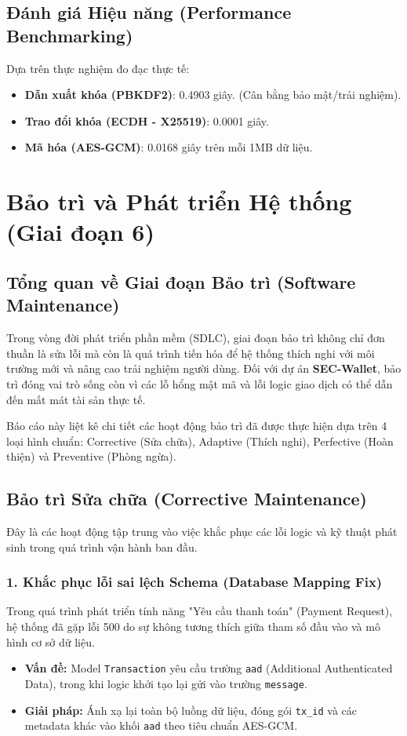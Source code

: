 \documentclass[11pt,a4paper]{article}
\begin{document}
\subsection{Đánh giá Hiệu năng (Performance Benchmarking)}
Dựa trên thực nghiệm đo đạc thực tế:
\begin{itemize}
    \item \textbf{Dẫn xuất khóa (PBKDF2)}: 0.4903 giây. (Cân bằng bảo mật/trải nghiệm).
    \item \textbf{Trao đổi khóa (ECDH - X25519)}: 0.0001 giây.
    \item \textbf{Mã hóa (AES-GCM)}: 0.0168 giây trên mỗi 1MB dữ liệu.
\end{itemize}

\section{Bảo trì và Phát triển Hệ thống (Giai đoạn 6)}
\subsection{Tổng quan về Giai đoạn Bảo trì (Software Maintenance)}
Trong vòng đời phát triển phần mềm (SDLC), giai đoạn bảo trì không chỉ đơn thuần là sửa lỗi mà còn là quá trình tiến hóa để hệ thống thích nghi với môi trường mới và nâng cao trải nghiệm người dùng. Đối với dự án \textbf{SEC-Wallet}, bảo trì đóng vai trò sống còn vì các lỗ hổng mật mã và lỗi logic giao dịch có thể dẫn đến mất mát tài sản thực tế.

Báo cáo này liệt kê chi tiết các hoạt động bảo trì đã được thực hiện dựa trên 4 loại hình chuẩn: Corrective (Sửa chữa), Adaptive (Thích nghi), Perfective (Hoàn thiện) và Preventive (Phòng ngừa).

\subsection{Bảo trì Sửa chữa (Corrective Maintenance)}
Đây là các hoạt động tập trung vào việc khắc phục các lỗi logic và kỹ thuật phát sinh trong quá trình vận hành ban đầu.

\subsubsection{1. Khắc phục lỗi sai lệch Schema (Database Mapping Fix)}
Trong quá trình phát triển tính năng "Yêu cầu thanh toán" (Payment Request), hệ thống đã gặp lỗi 500 do sự không tương thích giữa tham số đầu vào và mô hình cơ sở dữ liệu.
\begin{itemize}
    \item \textbf{Vấn đề:} Model \texttt{Transaction} yêu cầu trường \texttt{aad} (Additional Authenticated Data), trong khi logic khởi tạo lại gửi vào trường \texttt{message}.
    \item \textbf{Giải pháp:} Ánh xạ lại toàn bộ luồng dữ liệu, đóng gói \texttt{tx\_id} và các metadata khác vào khối \texttt{aad} theo tiêu chuẩn AES-GCM.
\end{itemize}
\end{document}
